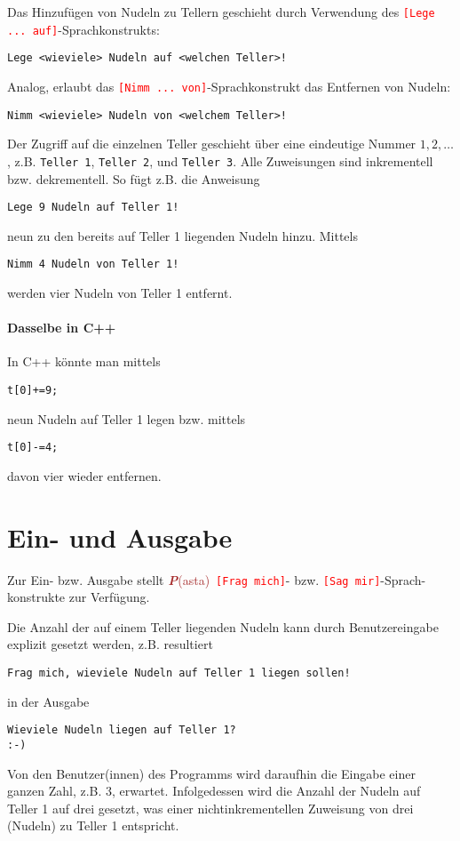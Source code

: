 \documentclass[11pt]{book}
\newcommand{\Pasta}{\textcolor{brown}{{\bf \em P}{\scriptsize{(asta)}}}}
\begin{document}
Das Hinzuf\"ugen von Nudeln zu Tellern geschieht durch Verwendung des
\textcolor{red}{\lstinline{[Lege ... auf]}}-Sprachkonstrukts:
\color{red}
\begin{lstlisting}
Lege <wieviele> Nudeln auf <welchen Teller>!
\end{lstlisting}
\color{black}
Analog, erlaubt das
\textcolor{red}{\lstinline{[Nimm ... von]}}-Sprachkonstrukt
das Entfernen von Nudeln:
\color{red}
\begin{lstlisting}
Nimm <wieviele> Nudeln von <welchem Teller>!
\end{lstlisting}
\color{black}

Der Zugriff auf die einzelnen Teller geschieht \"uber eine eindeutige
Nummer $1,2,\ldots$, z.B.  \lstinline{Teller 1}, \lstinline{Teller 2}, und
\lstinline{Teller 3}. Alle Zuweisungen sind inkrementell bzw. dekrementell.
So f\"ugt z.B. die Anweisung
\color{blue}
\begin{lstlisting}
Lege 9 Nudeln auf Teller 1!
\end{lstlisting}
\color{black}
neun zu den bereits auf Teller 1 liegenden Nudeln hinzu. Mittels
\color{blue}
\begin{lstlisting}
Nimm 4 Nudeln von Teller 1!
\end{lstlisting}
\color{black}
werden vier Nudeln von Teller 1 entfernt.

\paragraph{Dasselbe in C++}
In C++ k\"onnte man mittels
\begin{lstlisting}
t[0]+=9;
\end{lstlisting}
neun Nudeln auf Teller 1 legen bzw. mittels
\begin{lstlisting}
t[0]-=4;
\end{lstlisting}
davon vier wieder entfernen.




\section{Ein- und Ausgabe}
Zur Ein- bzw. Ausgabe stellt \Pasta\
\textcolor{red}{\lstinline{[Frag mich]}}- bzw.  
\textcolor{red}{\lstinline{[Sag mir]}}-Sprach-konstrukte zur Verf\"ugung.

Die Anzahl der auf einem Teller liegenden Nudeln kann durch Benutzereingabe
explizit gesetzt werden, z.B. resultiert
\color{blue}
\begin{lstlisting}
Frag mich, wieviele Nudeln auf Teller 1 liegen sollen!
\end{lstlisting}
\color{black}
in der Ausgabe
\color{purple}
\begin{lstlisting}
Wieviele Nudeln liegen auf Teller 1?
:-) 
\end{lstlisting}
\color{black}
Von den Benutzer(innen) des Programms wird daraufhin die Eingabe einer ganzen Zahl,
z.B. 3, erwartet. Infolgedessen wird die Anzahl der Nudeln auf Teller 1 auf drei
gesetzt, was einer nichtinkrementellen Zuweisung von drei (Nudeln) zu Teller 1
entspricht.
\end{document}
